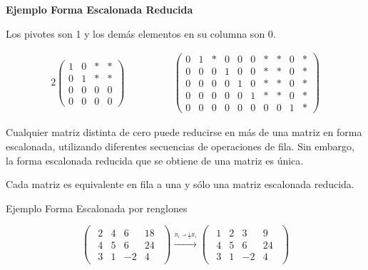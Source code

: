 \documentclass{article}
\begin{document}
\begin{large}
    \textbf{Ejemplo Forma Escalonada Reducida}
\end{large}

Los pivotes son 1 y los demás elementos en su columna son 0.

\begin{alignat*}{2}
    \begin{pmatrix}
        1&0&*&*\\
        0&1&*&*\\
        0&0&0&0\\
        0&0&0&0
    \end{pmatrix}
    & \hspace{ 4em}%
    \begin{pmatrix}
        0&1&*&0&0&0&*&*&0&*\\
        0&0&0&1&0&0&*&*&0&*\\
        0&0&0&0&1&0&*&*&0&*\\
        0&0&0&0&0&1&*&*&0&*\\
        0&0&0&0&0&0&0&0&1&*
    \end{pmatrix}
\end{alignat*}

Cualquier matriz distinta de cero puede reducirse en más de una matriz en forma escalonada, utilizando diferentes secuencias de operaciones de fila. Sin embargo, la forma escalonada reducida que se obtiene de una matriz es única.

\begin{tcolorbox}[colback=green!20!white,colframe=green!80!black,title=Unicidad de la Forma Escalonada Reducida]
    Cada matriz es equivalente en fila a una y sólo una matriz escalonada reducida.
\end{tcolorbox}

\begin{large}
    Ejemplo Forma Escalonada por renglones
\end{large}

\begin{equation*}
    \begin{pmatrix}
        \begin{array}{rrr|r}
            2 & 4 & 6 & 18\\
            4 & 5 & 6 & 24\\
            3 & 1 & -2 & 4
        \end{array}
    \end{pmatrix}
    \xrightarrow{\stackrel{R_1 \rightarrow \frac{1}{2}R_1}{}}
    \begin{pmatrix}
        \begin{array}{rrr|r}
            1 & 2 & 3 & 9\\
            4 & 5 & 6 & 24\\
            3 & 1 & -2 & 4
        \end{array}
    \end{pmatrix}
\end{equation*}
\end{document}
